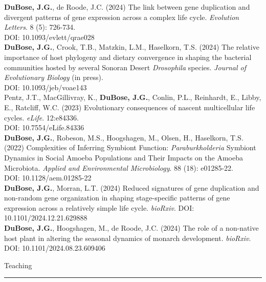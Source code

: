 \documentclass{article}
\begin{document}
\hangindent=0.7cm \textbf{DuBose, J.G.}, de Roode, J.C. (2024) The link between gene duplication and divergent patterns of gene expression across a complex life cycle. \emph{Evolution Letters}. 8 (5): 726-734. \\
DOI: 10.1093/evlett/qrae028 \\

\hangindent=0.7cm \textbf{DuBose, J.G.}, Crook, T.B., Matzkin, L.M., Haselkorn, T.S. (2024) The relative importance of host phylogeny and dietary convergence in shaping the bacterial communities hosted by several Sonoran Desert \emph{Drosophila} species. \emph{Journal of Evolutionary Biology} (in press).\\ 
DOI: 10.1093/jeb/voae143 \\

\hangindent=0.7cm Pentz, J.T., MacGillivray, K., \textbf{DuBose, J.G.}, Conlin, P.L., Reinhardt, E., Libby, E., Ratcliff, W.C. (2023) Evolutionary consequences of nascent multicellular life cycles. \emph{eLife}. 12:e84336. \\
DOI: 10.7554/eLife.84336 \\

\hangindent=0.7cm \textbf{DuBose, J.G.}, Robeson, M.S., Hoogshagen, M., Olsen, H., Haselkorn, T.S. (2022) Complexities of Inferring Symbiont Function: \emph{Paraburkholderia} Symbiont Dynamics in Social Amoeba Populations and Their Impacts on the Amoeba Microbiota. \emph{Applied and Environmental Microbiology}. 88 (18): e01285-22.\\
DOI: 10.1128/aem.01285-22 \\

\hangindent=0.7cm \textbf{DuBose, J.G.}, Morran, L.T. (2024) Reduced signatures of gene duplication and non-random gene organization in shaping stage-specific patterns of gene expression across a relatively simple life cycle. \emph{bioRxiv}. 
DOI: 10.1101/2024.12.21.629888 \\

\hangindent=0.7cm \textbf{DuBose, J.G.}, Hoogshagen, M., de Roode, J.C. (2024) The role of a non-native host plant in altering the seasonal dynamics of monarch development. \emph{bioRxiv}. \\
DOI: 10.1101/2024.08.23.609406 \\


\begin{flushleft}
{\Large Teaching} \rule{16.51cm}{0.4pt}\\
\end{flushleft}
\end{document}
